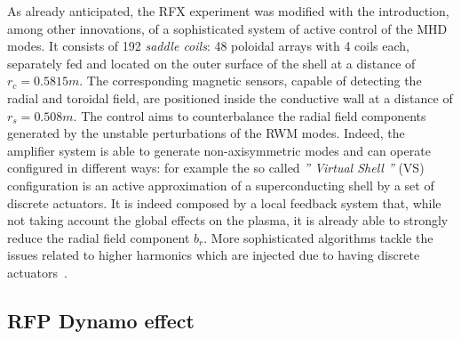 As already anticipated, the RFX experiment was modified with the introduction, among other innovations, of a sophisticated system of active control of the MHD modes. It consists of 192 \textit{saddle coils}: 48 poloidal arrays with 4 coils each, separately fed and located on the outer surface of the shell at a distance of $r_c = 0.5815m$. The corresponding magnetic sensors, capable of detecting the radial and toroidal field, are positioned inside the conductive wall at a distance of $r_s = 0.508m$. The control aims to counterbalance the radial field components generated by the unstable perturbations of the RWM modes. Indeed, the amplifier system is able to generate non-axisymmetric modes and can operate configured in different ways: for example the so called \emph{'' Virtual Shell ''} (VS) configuration is an active approximation of a superconducting shell by a set of discrete actuators. It is indeed composed by a local feedback system that, while not taking account the global effects on the plasma, it is already able to strongly reduce the radial field component $b_r$\cite{pizz78}\cite{pizz79}.
More sophisticated algorithms tackle the issues related to higher harmonics which are injected due to having discrete actuators~\cite{pizz81}.




\subsection{RFP Dynamo effect}

